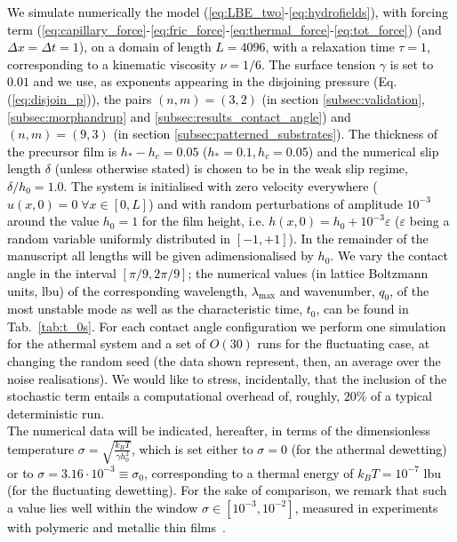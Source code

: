 \textcolor{black}{We simulate numerically the model 
(\ref{eq:LBE_two}-\ref{eq:hydrofields}), with forcing term (\ref{eq:capillary_force}-\ref{eq:fric_force}-\ref{eq:thermal_force}-\ref{eq:tot_force}) (and $\Delta x = \Delta t = 1$), on a domain 
of length $L=4096$,
with a relaxation time $\tau = 1$, corresponding to a kinematic viscosity $\nu = 1/6$.
The surface tension $\gamma$ is set to $0.01$ and we use, as exponents appearing in the disjoining pressure (Eq. (\ref{eq:disjoin_p})),
the pairs $(n,m)=(3,2)$ (in section \ref{subsec:validation}, \ref{subsec:morphandrup} and \ref{subsec:results_contact_angle}) 
and $(n,m)=(9,3)$ (in section \ref{subsec:patterned_substrates}).
The thickness of the precursor film is $h_{\ast}-h_c = 0.05$ ($h_{\ast}=0.1, h_c = 0.05$) and the numerical slip length $\delta$ (unless otherwise stated)
is chosen to be in the weak slip regime, $\delta/h_0 = 1.0$. %
The system is initialised with zero velocity everywhere ($u(x,0)=0 \; \forall x \in [0, L]$)
and with random perturbations of amplitude $10^{-3}$ around the value $h_0 = 1$ for the film height, i.e. 
$h(x,0) = h_0 + 10^{-3} \varepsilon$ ($\varepsilon$ being a random variable uniformly distributed 
in $[-1, +1]$).
In the remainder of the manuscript all lengths will be given adimensionalised by $h_0$.
We vary the contact angle in the interval $[\pi/9, 2\pi/9 ]$;
the numerical values (in lattice Boltzmann units, lbu) of the corresponding wavelength, $\lambda_{\text{max}}$ and wavenumber, $q_0$, of the most unstable mode as well as the characteristic time, $t_0$, can be found in Tab.~\ref{tab:t_0s}.
For each contact angle configuration we perform one simulation for the athermal system and a set 
of $O(30)$ runs for the fluctuating case, at changing the random seed (the data shown represent, then, an average over the noise realisations). We would like to stress, incidentally, that the inclusion of 
the stochastic term entails a computational overhead of, roughly, $20\%$ of a typical deterministic run.\\ 
The numerical data will be indicated, hereafter, in terms of the dimensionless temperature $\sigma = \sqrt{\frac{k_B T}{\gamma h_0^2}}$, which is set either to $\sigma=0$ (for the athermal dewetting) or to $\sigma = 3.16 \cdot 10^{-3} \equiv \sigma_0$, 
corresponding to a thermal energy
of $k_B T = 10^{-7}$ lbu (for the fluctuating dewetting). For the sake of comparison, we remark 
that such a value lies well within the window $\sigma \in [10^{-3}, 10^{-2}]$, measured in experiments with polymeric and metallic thin films~\cite{PhysRevLett.99.114503,doi:10.1021/la4009784}}.

